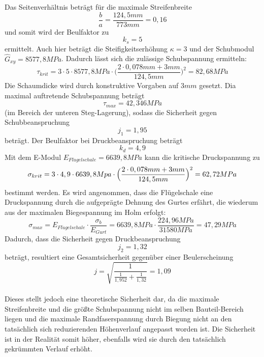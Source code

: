 \noindent Das Seitenverhältnis beträgt für die maximale Streifenbreite
\begin{equation}
	\frac{b}{a}=\frac{124,5 mm}{773 mm}=0,16
\end{equation}
und somit wird der Beulfaktor zu 
\begin{equation}
	k_{s}=5
\end{equation} 
ermittelt. Auch hier beträgt die Steifigkeitserhöhung $\kappa=3$ und der Schubmodul $\hat{G}_{xy}=8577,8 MPa$. Dadurch lässt sich die zulässige Schubspannung ermitteln:
\begin{equation}
	\tau_{krit}=3\cdot 5\cdot 8577,8 MPa\cdot\biggl(\frac{2\cdot 0,078mm + 3mm}{124,5 mm}\biggr)^{2} =82,68 MPa
\end{equation}
Die Schaumdicke wird durch konstruktive Vorgaben auf $3 mm$ gesetzt. Dia maximal auftretende Schubspannung beträgt
\begin{equation}
	\tau_{max}=42,346 MPa
\end{equation}
(im Bereich der unteren Steg-Lagerung), sodass die Sicherheit gegen Schubbeanspruchung 
\begin{equation}
	j_{1}=1,95
\end{equation}
beträgt. Der Beulfaktor bei Druckbeanspruchung beträgt
\begin{equation}
	k_{d} = 4,9
\end{equation}
Mit dem E-Modul $E_{Fl\ddot{u}gelschale} = 6639,8 MPa$ kann die kritische Druckspannung zu
\begin{equation}
	\sigma_{krit} = 3\cdot 4,9\cdot 6639,8 Mpa\cdot\Bigl(\frac{2\cdot 0,078mm+3mm}{124,5mm}\Bigr)^{2}=62,72 MPa
\end{equation}
bestimmt werden. Es wird angenommen, dass die Flügelschale eine Druckspannung durch die aufgeprägte Dehnung des Gurtes erfährt, die wiederum aus der maximalen Biegespannung im Holm erfolgt:
\begin{equation}
	\sigma_{max}=E_{Fl\ddot{u}gelschale}\cdot\frac{\sigma_{b}}{E_{Gurt}}=6639,8 MPa\cdot\frac{224,96 MPa}{31580 MPa}=47,29 MPa
\end{equation}
Dadurch, dass die Sicherheit gegen Druckbeanspruchung
\begin{equation}
	j_{2}=1,32
\end{equation}
beträgt, resultiert eine Gesamtsicherheit gegenüber einer Beulerscheinung
\begin{equation}
	j=\sqrt{\frac{1}{\frac{1}{1,952}+\frac{1}{1,32}}}=1,09
\end{equation}\\

 \noindent Dieses stellt jedoch eine theoretische Sicherheit dar, da die maximale Streifenbreite und die größte Schubspannung nicht im selben Bauteil-Bereich liegen und die maximale Randfaserspannung durch Biegung nicht an den tatsächlich sich reduzierenden Höhenverlauf angepasst worden ist. Die Sicherheit ist in der Realität somit höher, ebenfalls wird sie durch den tatsächlich gekrümmten Verlauf erhöht.